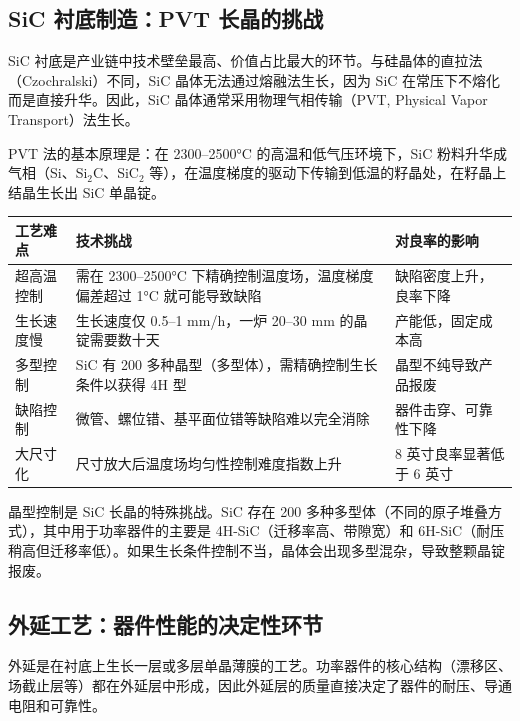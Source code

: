 \subsection{SiC 衬底制造：PVT 长晶的挑战}

SiC 衬底是产业链中技术壁垒最高、价值占比最大的环节。与硅晶体的直拉法（Czochralski）不同，SiC 晶体无法通过熔融法生长，因为 SiC 在常压下不熔化而是直接升华。因此，SiC 晶体通常采用物理气相传输（PVT, Physical Vapor Transport）法生长。

PVT 法的基本原理是：在 2300–2500°C 的高温和低气压环境下，SiC 粉料升华成气相（Si、Si$_2$C、SiC$_2$ 等），在温度梯度的驱动下传输到低温的籽晶处，在籽晶上结晶生长出 SiC 单晶锭。

\begin{exhibitbox}
\centering
\small
\begin{tabularx}{\textwidth}{L{2.8cm} X L{2.5cm}}
\toprule
\textbf{工艺难点} & \textbf{技术挑战} & \textbf{对良率的影响} \\
\midrule
超高温控制 & 需在 2300–2500°C 下精确控制温度场，温度梯度偏差超过 1°C 就可能导致缺陷 & 缺陷密度上升，良率下降 \\
生长速度慢 & 生长速度仅 0.5–1 mm/h，一炉 20–30 mm 的晶锭需要数十天 & 产能低，固定成本高 \\
多型控制 & SiC 有 200 多种晶型（多型体），需精确控制生长条件以获得 4H 型 & 晶型不纯导致产品报废 \\
缺陷控制 & 微管、螺位错、基平面位错等缺陷难以完全消除 & 器件击穿、可靠性下降 \\
大尺寸化 & 尺寸放大后温度场均匀性控制难度指数上升 & 8 英寸良率显著低于 6 英寸 \\
\bottomrule
\end{tabularx}
\end{exhibitbox}

晶型控制是 SiC 长晶的特殊挑战。SiC 存在 200 多种多型体（不同的原子堆叠方式），其中用于功率器件的主要是 4H-SiC（迁移率高、带隙宽）和 6H-SiC（耐压稍高但迁移率低）。如果生长条件控制不当，晶体会出现多型混杂，导致整颗晶锭报废。

\subsection{外延工艺：器件性能的决定性环节}

外延是在衬底上生长一层或多层单晶薄膜的工艺。功率器件的核心结构（漂移区、场截止层等）都在外延层中形成，因此外延层的质量直接决定了器件的耐压、导通电阻和可靠性。

